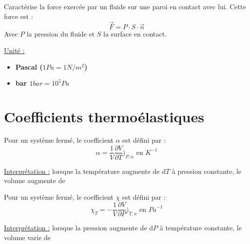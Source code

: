 \documentclass[12pt]{article}
\theoremstyle{cstyle}{\newtheorem{definition}{Définition}[section]}
\theoremstyle{cstyle}{\newtheorem{proposition}[definition]{Propriété}}
\theoremstyle{mystyle}{\newtheorem{theorem}[definition]{Théorème}}
\theoremstyle{mystyle}{\newtheorem{lemma}[definition]{Lemme}}
\theoremstyle{mystyle}{\newtheorem{corollary}[definition]{Corollaire}}
\theoremstyle{mystyle}{\newtheorem*{remark}{Remarque}}
\theoremstyle{mystyle}{\newtheorem*{remarks}{Remarques}}
\theoremstyle{mystyle}{\newtheorem*{example}{Exemple}}
\theoremstyle{mystyle}{\newtheorem*{examples}{Exemples}}
\theoremstyle{definition}{\newtheorem*{exercise}{Exercice}}
\theoremstyle{mystyle}{\newtheorem*{methode}{Méthode}}
\theoremstyle{cstyle}{\newtheorem*{cthm}{}}
\theoremstyle{warn}
\begin{document}
\newpage
\begin{minipage}[t]{0.45\textwidth}
	
	\begin{definition}[Pression]
		Caractérise la force exercée par un fluide sur une paroi en contact avec lui. Cette force est :
		\[ \vec{F} = P \cdot S \cdot \vec{n} \]
		Avec $P$ la pression du fluide et $S$ la surface en contact.
		
		\underline{Unité :} \begin{itemize}
			\item \textbf{Pascal (\(1Pa = 1N/m^2\))} 	
			\item \textbf{bar \(1bar = 10^5 Pa\)}
		\end{itemize}	
	\end{definition}

	\section{Coefficients thermoélastiques}
	
	\begin{definition}
		Pour un système fermé, le coefficient $\alpha$ est défini par :
		\[
		\alpha = \frac{1}{V} \frac{\partial V}{\partial T}\Big)_{P,n} \text{ en } K^{-1}
		\]
		
		\underline{Interprétation :} lorsque la température augmente de d$T$ à pression constante, le volume augmente de 
	\end{definition}

	\begin{definition}
		Pour un système fermé, le coefficient $\chi$ est défini par :
		\[
		\chi_T = -\frac{1}{V} \frac{\partial V}{\partial P}\Big)_{T,n} \text{ en } {Pa}^{-1}
		\]
		
		\underline{Interprétation :} lorsque la pression augmente de d$P$ à température constante, le volume varie de 
	\end{definition}

	
	

\end{minipage}
\hfill
\end{document}

